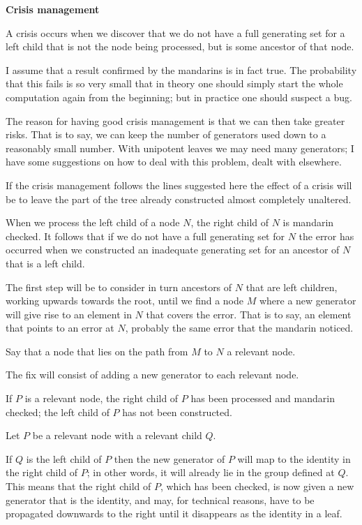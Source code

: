 
\centerline{\bf Crisis management}
A crisis occurs when we discover that we do not have a full generating set for a left child that
is not the node being processed, but is some ancestor of that node.

I assume that a result confirmed by the mandarins is in fact true.  The probability that this fails
is so very small that in theory one should simply start the whole computation again from the
beginning; but in practice one should suspect a bug.

The reason for having good crisis management is that we can then take greater risks.  That is
to say, we can keep the number of generators used down to a reasonably small number.
With unipotent leaves we may need many generators; I have some suggestions on how to
deal with this problem, dealt with elsewhere.

If the crisis management follows the lines suggested here the effect of a crisis will
be to leave the part of the tree already constructed almost completely unaltered.

When we process the left child of a node $N$, the right child of $N$ is mandarin checked.  
It follows that if we do not have a full generating set for $N$ the error has occurred when
we constructed an inadequate generating set for an ancestor of $N$ that is a left child.

The first step will be to consider in turn ancestors of $N$ that are left children, working upwards
towards the root, until we find a node $M$ where a new generator will give rise to an element in
$N$ that covers the error.  That is to say, an element that points to an error at $N$, probably
the same error that the mandarin noticed.

Say that a node that lies on the path from $M$ to $N$ a relevant node.

The fix will consist of adding a new generator to each relevant node.

If $P$ is a relevant node, the right child of $P$ has been processed and mandarin checked;
the left child of $P$ has not been constructed.

Let $P$ be a relevant node with a relevant child $Q$.

If $Q$ is the left child of $P$ then the new generator of $P$ will map to the identity in the
right child of $P$; in other words, it will already lie in the group defined at $Q$.  This means
that the right child of $P$, which has been checked, is now given a new generator that is
the identity, and may, for technical reasons,  have to be propagated downwards to the right until it disappears as the identity in a leaf.

